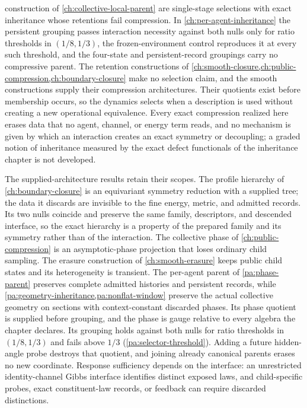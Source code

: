 construction of \cref{ch:collective-local-parent} are single-stage selections with exact inheritance whose retentions fail compression. In \cref{ch:per-agent-inheritance} the persistent grouping passes interaction necessity against both nulls only for ratio thresholds in $(1/8,1/3)$, the frozen-environment control reproduces it at every such threshold, and the four-state and persistent-record groupings carry no compressive parent. The retention constructions of \cref{ch:smooth-closure,ch:public-compression,ch:boundary-closure} make no selection claim, and the smooth constructions supply their compression architectures. Their quotients exist before membership occurs, so the dynamics selects when a description is used without creating a new operational equivalence. Every exact compression realized here erases data that no agent, channel, or energy term reads, and no mechanism is given by which an interaction creates an exact symmetry or decoupling; a graded notion of inheritance measured by the exact defect functionals of the inheritance chapter is not developed.

The supplied-architecture results retain their scopes. The profile hierarchy of \cref{ch:boundary-closure} is an equivariant symmetry reduction with a supplied tree; the data it discards are invisible to the fine energy, metric, and admitted records. Its two nulls coincide and preserve the same family, descriptors, and descended interface, so the exact hierarchy is a property of the prepared family and its symmetry rather than of the interaction. The collective phase of \cref{ch:public-compression} is an asymptotic-phase projection that loses ordinary child sampling. The erasure construction of \cref{ch:smooth-erasure} keeps public child states and its heterogeneity is transient. The per-agent parent of \cref{pa:phase-parent} preserves complete admitted histories and persistent records, while \cref{pa:geometry-inheritance,pa:nonflat-window} preserve the actual collective geometry on sections with context-constant discarded phases. Its phase quotient is supplied before grouping, and the phase is gauge relative to every algebra the chapter declares. Its grouping holds against both nulls for ratio thresholds in $(1/8,1/3)$ and fails above $1/3$ (\cref{pa:selector-threshold}). Adding a future hidden-angle probe destroys that quotient, and joining already canonical parents erases no new coordinate. Response sufficiency depends on the interface: an unrestricted identity-channel Gibbs interface identifies distinct exposed laws, and child-specific probes, exact constituent-law records, or feedback can require discarded distinctions.

